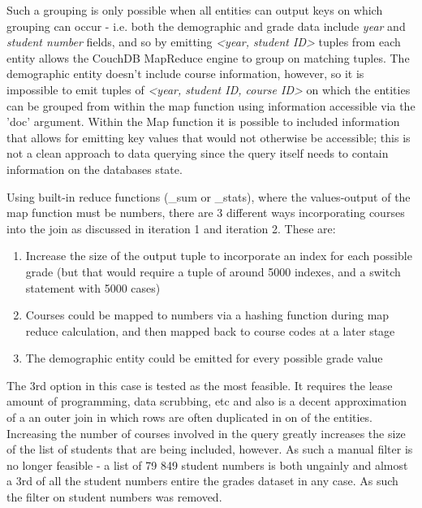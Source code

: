Such a grouping is only possible when all entities can output keys on which grouping can occur - i.e. both the demographic and grade data include \textit{year} and \textit{student number} fields, and so by emitting \textit{<year, student ID>} tuples from each entity allows the CouchDB MapReduce engine to group on matching tuples. The demographic entity doesn't include course information, however, so it is impossible to emit tuples of \textit{<year, student ID, course ID>} on which the entities can be grouped from within the map function using information accessible via the 'doc' argument. Within the Map function it is possible to included information that allows for emitting key values that would not otherwise be accessible; this is not a clean approach to data querying since the query itself needs to contain information on the databases state.

Using built-in reduce functions (\_sum or \_stats), where the values-output of the map function must be numbers, there are 3 different ways incorporating courses into the join as discussed in iteration 1 and iteration 2. These are:

\begin{enumerate}
    \item Increase the size of the output tuple to incorporate an index for each possible grade (but that would require a tuple of around 5000 indexes, and a switch statement with 5000 cases)
    \item Courses could be mapped to numbers via a hashing function during map reduce calculation, and then mapped back to course codes at a later stage
    \item The demographic entity could be emitted for every possible grade value
\end{enumerate}

The 3rd option in this case is tested as the most feasible. It requires the lease amount of programming, data scrubbing, etc and also is a decent approximation of a an outer join in which rows are often duplicated in on of the entities. Increasing the number of courses involved in the query greatly increases the size of the list of students that are being included, however. As such a manual filter is no longer feasible - a list of 79 849 student numbers is both ungainly and almost a 3rd of all the student numbers entire the grades dataset in any case. As such the filter on student numbers was removed.


